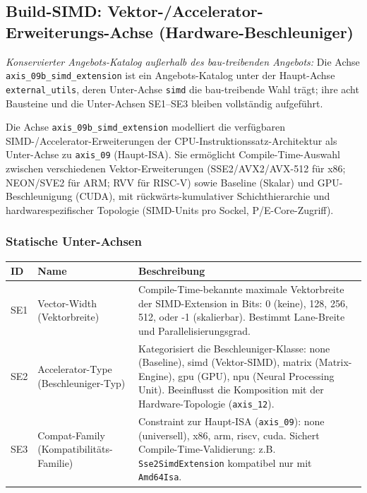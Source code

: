 \subsection[Build-SIMD: Vektor-/Accelerator-Erweiterungs-Achse]{Build-SIMD: Vektor-/\allowbreak{}Accelerator-Erweiterungs-Achse (Hardware-Beschleuniger)} %

\emph{Konservierter Angebots-Katalog außerhalb des bau-treibenden Angebots:} Die Achse \texttt{axis\_\allowbreak{}09b\_\allowbreak{}simd\_\allowbreak{}extension} ist ein Angebots-Katalog unter der Haupt-Achse \texttt{external\_\allowbreak{}utils}, deren Unter-Achse \texttt{simd} die bau-treibende Wahl trägt; ihre acht Bausteine und die Unter-Achsen SE1--SE3 bleiben vollständig aufgeführt.

Die Achse \texttt{axis\_\allowbreak{}09b\_\allowbreak{}simd\_\allowbreak{}extension} modelliert die verfügbaren SIMD-/\allowbreak{}Accelerator-Erweiterungen der CPU-Instruktionssatz-Architektur als Unter-Achse zu \texttt{axis\_\allowbreak{}09} (Haupt-ISA). Sie ermöglicht Compile-Time-Auswahl zwischen verschiedenen Vektor-Erweiterungen (SSE2/\allowbreak{}AVX2/\allowbreak{}AVX-512 für x86; NEON/\allowbreak{}SVE2 für ARM\@; RVV für RISC-V) sowie Baseline (Skalar) und GPU-Beschleunigung (CUDA), mit rückwärts-kumulativer Schichthierarchie und hardwarespezifischer Topologie (SIMD-Units pro Sockel, P/\allowbreak{}E-Core-Zugriff).

\subsubsection*{Statische Unter-Achsen}

\begin{scriptsize}
\begin{longtable}{@{}>{\raggedright\arraybackslash}p{1.8cm} >{\raggedright\arraybackslash}p{3.2cm} >{\raggedright\arraybackslash}p{8.5cm}@{}}
\toprule
ID & Name & Beschreibung \\
\midrule
\endhead%
SE1 & Vector-Width (Vektorbreite) & Compile-Time-bekannte maximale Vektorbreite der SIMD-Extension in Bits: 0 (keine), 128, 256, 512, oder -1 (skalierbar). Bestimmt Lane-Breite und Parallelisierungsgrad. \\
SE2 & Accelerator-Type (Beschleuniger-Typ) & Kategorisiert die Beschleuniger-Klasse: none (Baseline), simd (Vektor-SIMD), matrix (Matrix-Engine), gpu (GPU), npu (Neural Processing Unit). Beeinflusst die Komposition mit der Hardware-Topologie (\texttt{axis\_\allowbreak{}12}). \\
SE3 & Compat-Family (Kompatibilitäts-Familie) & Constraint zur Haupt-ISA (\texttt{axis\_\allowbreak{}09}): none (universell), x86, arm, riscv, cuda. Sichert Compile-Time-Validierung: z.B. \texttt{Sse2\allowbreak{}Simd\allowbreak{}Extension} kompatibel nur mit \texttt{Amd64\allowbreak{}Isa}. \\
\bottomrule
\end{longtable}
\end{scriptsize}

